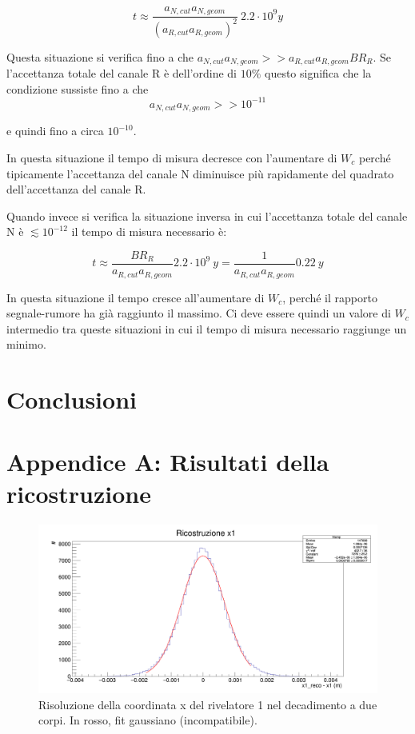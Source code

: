 \documentclass[8pt]{extarticle}
\begin{document}
$$
t \approx \frac{a_{N, cut} a_{N, geom}}{(a_{R, cut} a_{R, geom})^2}\ 2.2 \cdot 10^9 y
$$

Questa situazione si verifica fino a che $a_{N, cut} a_{N, geom} >> a_{R, cut} a_{R, geom} BR_R$. Se l'accettanza totale del canale R è dell'ordine di $10 \%$ questo significa che la condizione sussiste fino a che 
$$
a_{N, cut} a_{N, geom} >> 10^{-11}
$$

e quindi fino a circa $10^{-10}$.

In questa situazione il tempo di misura decresce con l'aumentare di $W_c$ perché tipicamente l'accettanza del canale N diminuisce più rapidamente del quadrato dell'accettanza del canale R.

Quando invece si verifica la situazione inversa in cui l'accettanza totale del canale N è $\lesssim 10^{-12}$ il tempo di misura necessario è:

$$
t \approx \frac{BR_R}{a_{R, cut}a_{R,geom}} 2.2 \cdot 10^9\ y = \frac{1}{a_{R, cut}a_{R,geom}} 0.22\ y
$$

In questa situazione il tempo cresce all'aumentare di $W_c$, perché il rapporto segnale-rumore ha già raggiunto il massimo. Ci deve essere quindi un valore di $W_c$ intermedio tra queste situazioni in cui il tempo di misura necessario raggiunge un minimo.



\section{Conclusioni} \label{sec:conclusioni}

\section{Appendice A: Risultati della ricostruzione} \label{sec:grafici}

\clearpage

\begin{figure}[!h]
\begin{center}
\includegraphics[scale=0.25]{reco_x1_N}
\caption{Risoluzione della coordinata x del rivelatore 1 nel decadimento a due corpi. In rosso, fit gaussiano (incompatibile).}
\label{fig:reco_x1_N}
\end{center}
\end{figure}
\end{document}
